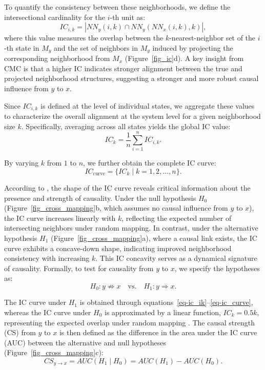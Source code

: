 \documentclass[authoryear,preprint,review,12pt]{elsarticle}
\begin{document}
To quantify the consistency between these neighborhoods, we define the intersectional cardinality for the $i$-th unit as:
\begin{equation}\label{eq-ic_ik}
IC_{i,k} = \left| \mathit{NN}_y(i,k) \cap \mathit{NN}_y(\mathit{NN}_x(i,k),k) \right|,
\end{equation}
\noindent where this value measures the overlap between the $k$-nearest-neighbor set of the $i$-th state in $M_y$ and the set of neighbors in $M_y$ induced by projecting the corresponding neighborhood from $M_x$ (Figure~\ref{fig_ic}d). A key insight from CMC \citep{tao2025cmc} is that a higher IC indicates stronger alignment between the true and projected neighborhood structures, suggesting a stronger and more robust causal influence from $y$ to $x$.

Since $IC_{i,k}$ is defined at the level of individual states, we aggregate these values to characterize the overall alignment at the system level for a given neighborhood size $k$. Specifically, averaging across all states yields the global IC value:
\begin{equation}\label{eq-ic_k}
IC_k = \frac{1}{n} \sum_{i=1}^n IC_{i,k}.
\end{equation}

By varying $k$ from $1$ to $n$, we further obtain the complete IC curve:
\begin{equation}\label{eq-ic_curve}
IC_{\text{curve}} = \{ IC_k \mid k = 1, 2, \dots, n \}.
\end{equation}

According to \cite{tao2025cmc}, the shape of the IC curve reveals critical information about the presence and strength of causality. Under the null hypothesis $H_0$ (Figure~\ref{fig_cross_mapping}b, which assumes no causal influence from $y$ to $x$), the IC curve increases linearly with $k$, reflecting the expected number of intersecting neighbors under random mapping. In contrast, under the alternative hypothesis $H_1$ (Figure~\ref{fig_cross_mapping}a), where a causal link exists, the IC curve exhibits a concave-down shape, indicating improved neighborhood consistency with increasing $k$. This IC concavity serves as a dynamical signature of causality. Formally, to test for causality from $y$ to $x$, we specify the hypotheses as:
\begin{equation}\label{eq-hypothesis}
H_0: y \not\Rightarrow x \quad \text{vs.} \quad H_1: y \Rightarrow x. 
\end{equation}

The IC curve under $H_1$ is obtained through equations~\ref{eq-ic_ik}--\ref{eq-ic_curve}, whereas the IC curve under $H_0$ is approximated by a linear function, $IC_k = 0.5k$, representing the expected overlap under random mapping \citep{tao2025cmc}. The causal strength (CS) from $y$ to $x$ is then defined as the difference in the area under the IC curve (AUC) between the alternative and null hypotheses (Figure~\ref{fig_cross_mapping}c):
\begin{equation}\label{eq-cs}
CS_{y \rightarrow x} = AUC(H_1 \mid H_0) = AUC(H_1) - AUC(H_0).
\end{equation}
\end{document}

